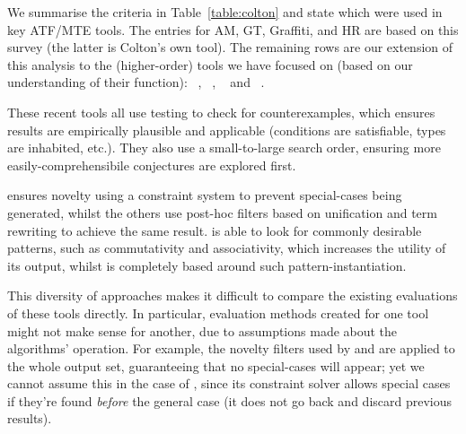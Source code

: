 

We summarise the criteria in Table~\ref{table:colton} and state which were used
in key ATF/MTE tools. The entries for AM, GT, Graffiti, \Bagai{} and HR are
based on this survey (the latter is Colton's own tool). The remaining rows are
our extension of this analysis to the (higher-order) tools we have focused on
(based on our understanding of their function): \quickspec{}~\cite{QuickSpec},
\speculate{}~\cite{braquehais2017speculate},
\isacosy{}~\cite{Johansson.Dixon.Bundy:conjecture-generation}
and \isascheme{}~\cite{Montano-Rivas.McCasland.Dixon.ea:2012}.

These recent tools all use testing to check for counterexamples, which ensures
results are empirically plausible and applicable (conditions are satisfiable,
types are inhabited, etc.). They also use a small-to-large search order,
ensuring more easily-comprehensibile conjectures are explored first.

\isacosy{} ensures novelty using a constraint system to prevent special-cases
being generated, whilst the others use post-hoc filters based on unification and
term rewriting to achieve the same result. \isacosy{} is able to look for
commonly desirable patterns, such as commutativity and associativity, which
increases the utility of its output, whilst \isascheme{} is completely based
around such pattern-instantiation.

This diversity of approaches makes it difficult to compare the existing
evaluations of these tools directly. In particular, evaluation methods created
for one tool might not make sense for another, due to assumptions made about
the algorithms' operation. For example, the novelty filters used by \quickspec{}
and \speculate{} are applied to the whole output set, guaranteeing that no
special-cases will appear; yet we cannot assume this in the case of \isacosy{},
since its constraint solver allows special cases if they're found \emph{before}
the general case (it does not go back and discard previous results).

